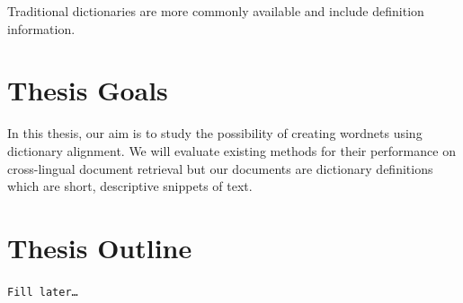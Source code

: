 Traditional dictionaries are more commonly available and include definition information.

\section{Thesis Goals}%
\label{sec:thesis_goals}
In this thesis, our aim is to study the possibility of creating wordnets using dictionary alignment.
We will evaluate existing methods for their performance on cross-lingual document retrieval but our documents are dictionary definitions which are short, descriptive snippets of text.

\section{Thesis Outline}%
\label{sec:thesis_outline}
\texttt{Fill later\ldots}
